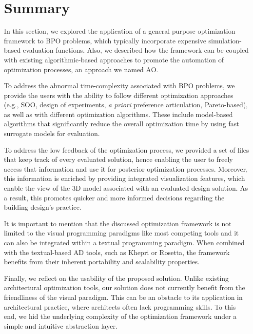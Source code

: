 \section{Summary}

In this section, we explored the application of a general purpose optimization framework to \ac{BPO} problems, which typically incorporate expensive simulation-based evaluation functions. Also, we described how the framework can be coupled with existing algorithmic-based approaches to promote the automation of optimization processes, an approach we named \ac{AO}.

To address the abnormal time-complexity associated with \ac{BPO} problems, we provide the users with the ability to follow different optimization approaches (e.g., \ac{SOO}, design of experiments, \textit{a priori} preference articulation, Pareto-based), as well as with different optimization algorithms. These include model-based algorithms that significantly reduce the overall optimization time by using fast surrogate models for evaluation. %

To address the low feedback of the optimization process, we provided a set of files that keep track of every evaluated solution, hence enabling the user to freely access that information and use it for posterior optimization processes. Moreover, this information is enriched by providing integrated visualization features, which enable the view of the 3D model associated with an evaluated design solution. As a result, this promotes quicker and more informed decisions regarding the building design's practice.

It is important to mention that the discussed optimization framework is not limited to the visual programming paradigms like most competing tools and it can also be integrated within a textual programming paradigm. When combined with the textual-based \ac{AD} tools, such as Khepri or Rosetta, the framework benefits from their inherent portability and scalability properties. 

Finally, we reflect on the usability of the proposed solution. Unlike existing architectural optimization tools, our solution does not currently benefit from the friendliness of the visual paradigm. This can be an obstacle to its application in architectural practice, where architects often lack programming skills. To this end, we hid the underlying complexity of the optimization framework under a simple and intuitive abstraction layer. 


